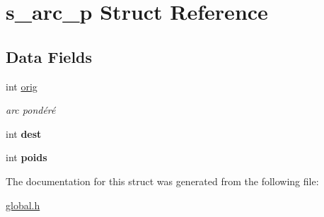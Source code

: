 \hypertarget{structs__arc__p}{}\section{s\+\_\+arc\+\_\+p Struct Reference}
\label{structs__arc__p}
\subsection*{Data Fields}
\begin{DoxyCompactItemize}
\item 
\mbox{\label{structs__arc__p_a9e217f04c0fbbe53b5ad22ba4eb2af25}} 
int \mbox{\hyperlink{structs__arc__p_a9e217f04c0fbbe53b5ad22ba4eb2af25}{orig}}
\begin{DoxyCompactList}\small\item\em arc pondéré \end{DoxyCompactList}\item 
\mbox{\label{structs__arc__p_ae5163ff230abd4115d86194ad89467b5}} 
int {\bfseries dest}
\item 
\mbox{\label{structs__arc__p_ac1abe8fa63a4167cf11ef707f524f0c4}} 
int {\bfseries poids}
\end{DoxyCompactItemize}


The documentation for this struct was generated from the following file\+:\begin{DoxyCompactItemize}
\item 
\mbox{\hyperlink{global_8h}{global.\+h}}\end{DoxyCompactItemize}
